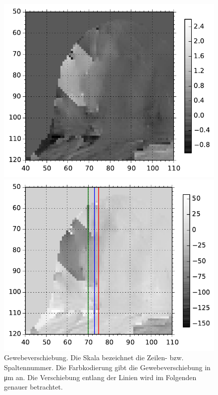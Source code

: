 \documentclass[
    11pt,
    ngerman
]{scrbook}
\begin{document}
\begin{figure}[htbp]
    \begin{minipage}[htbp]{.48\textwidth}
        \centering
        \includegraphics[width=.9\textwidth]{Abbildungen/diff_standart_mask.pdf}
        \caption{%
            Um Phasensprünge bereinigtes Phasenbild. Die Phasenverschiebung ohne US wurde abgezogen. Die Skala bezeichnet die Zeilen- bzw. Spaltennummer. Die Farbkodierung gibt die Phasenverschiebung in Vielfachen von $2\piup$ an. 
        }
        \label{fig:prob1_unwrapped}
    \end{minipage}
    \hfill
    \begin{minipage}[htbp]{.48\textwidth}
        \centering
        \includegraphics[width=.9\textwidth]{Abbildungen/dis_standart_lines.pdf}
        \caption{%
            Gewebeverschiebung. Die Skala bezeichnet die Zeilen- bzw. Spaltennummer. Die Farbkodierung gibt die Gewebeverschiebung in \si{\micro\meter} an. Die Verschiebung entlang der Linien wird im Folgenden genauer betrachtet.
        }
        \label{fig:prob1_displacement}
    \end{minipage}
\end{figure}
\end{document}
